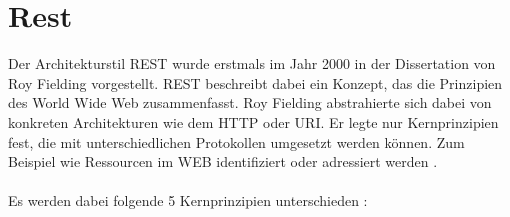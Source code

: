 \chapter{Rest}
\label{sec:rest}
Der Architekturstil \acrfull{REST} wurde erstmals im Jahr 2000 in der Dissertation von Roy Fielding vorgestellt. REST beschreibt dabei ein Konzept, das die Prinzipien des World Wide Web zusammenfasst. Roy Fielding abstrahierte sich dabei von konkreten Architekturen wie dem \acrfull{HTTP} oder \acrfull{URI}. Er legte nur Kernprinzipien fest, die mit unterschiedlichen Protokollen umgesetzt werden können. Zum Beispiel wie Ressourcen im WEB identifiziert oder adressiert werden \cite{fielding:restDis}. \\
\\
Es werden dabei folgende 5 Kernprinzipien unterschieden \cite{restHttp:book}: 
